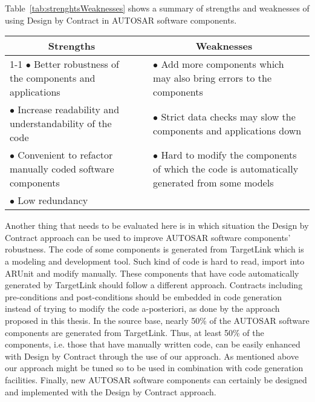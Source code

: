 Table~\ref{tab:strenghtsWeaknesses} shows a summary of strengths and weaknesses of using Design by Contract in AUTOSAR software components. 

\begin{table*}[htb]
\centering
\begin{tabular}{p{7.5cm} l p{9cm}}
\hline
\multicolumn{1}{c}{Strengths} & \multicolumn{2}{c}{Weaknesses  } \\
[.1ex]
\cline{1-1}  \cline{3-3} 
$\bullet$ Better robustness of the components and applications  &  & $\bullet$ Add more components which may also bring errors to the components \\
[.8ex]

$\bullet$ Increase readability and understandability of the code   &  & $\bullet$ Strict data checks may slow the components and applications down  \\
[.8ex]

$\bullet$ Convenient to refactor manually coded software components  &  & $\bullet$ Hard to modify the components of which the code is automatically  generated from some models \\
[-1.6ex]

$\bullet$ Low redundancy &  &          \\

\hline
\end{tabular}
\caption{Strengths and weaknesses of the Design by Contract approach in AUTOSAR}
\label{tab:strenghtsWeaknesses}
\vspace{-.6cm}
\end{table*}


Another thing that needs to be evaluated here is in which situation the Design by Contract approach can be used to improve AUTOSAR software components' robustness. %
The code of some components is generated from TargetLink which is a modeling and development tool. Such kind of code is hard to read, import into ARUnit and modify manually. These components that have code automatically generated by TargetLink should follow a different approach. Contracts including pre-conditions and post-conditions should be embedded in code generation instead of trying to modify the code a-posteriori, as done by the approach proposed in this thesis. In the source base, nearly 50\% of the AUTOSAR software components are generated from TargetLink. Thus, at least 50\% of the components, i.e. those that have manually written code, can be easily enhanced with Design by Contract through the use of our approach. %
As mentioned above our approach might be tuned so to be used in combination with code generation facilities. 
Finally, new AUTOSAR software components can certainly be designed and implemented with the Design by Contract approach.

